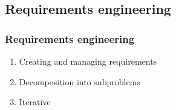 \subsection{Requirements engineering}

\begin{frame}\frametitle{Requirements engineering}
    \begin{enumerate}
        \item Creating and managing requirements
        \item Decomposition into subproblems
        \item Iterative
    \end{enumerate}
\end{frame}